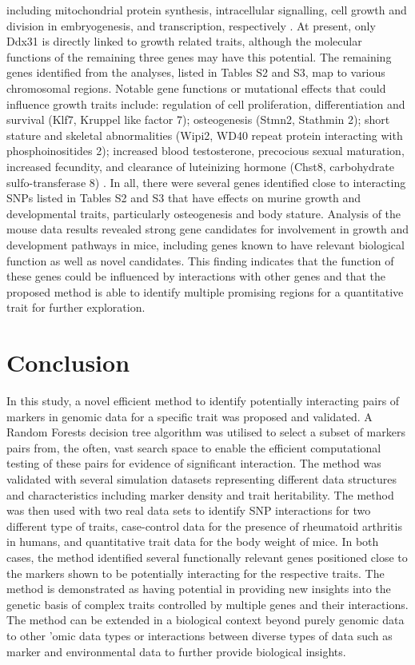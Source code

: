 \documentclass[preprint,12pt,3p]{elsarticle}
\begin{document}
including mitochondrial protein synthesis, intracellular signalling, cell growth and division in embryogenesis, and
transcription, respectively \cite[]{stelzerGeneCardsSuiteGene2016}. At present, only Ddx31 is directly linked to
growth related traits, although the molecular functions of the remaining three genes may have this potential.  The
remaining genes identified from the analyses, listed in Tables S2 and S3, map to various chromosomal regions. Notable
gene functions or mutational effects that could influence growth traits include: regulation of cell proliferation,
differentiation and survival (Klf7, Kruppel like factor 7); osteogenesis (Stmn2, Stathmin 2); short stature and skeletal
abnormalities (Wipi2, WD40 repeat protein interacting with phosphoinositides 2); increased blood testosterone,
precocious sexual maturation, increased fecundity, and clearance of luteinizing hormone (Chst8, carbohydrate
sulfo-transferase 8) \cite[]{stelzerGeneCardsSuiteGene2016}. In all, there were several genes identified close to
interacting SNPs listed in Tables S2 and S3 that have effects on murine growth and developmental traits, particularly
osteogenesis and body stature.  Analysis of the mouse data results revealed strong gene candidates for involvement in
growth and development pathways in mice, including genes known to have relevant biological function as well as novel
candidates. This finding indicates that the function of these genes could be influenced by interactions with other genes
and that the proposed method is able to identify multiple promising regions for a quantitative trait for further
exploration.



\section{Conclusion}

In this study, a novel efficient method to identify potentially interacting pairs of markers in genomic data for a
specific trait was proposed and validated. A Random Forests decision tree algorithm was utilised to select a subset of
markers pairs from, the often, vast search space to enable the efficient computational testing of these pairs for
evidence of significant interaction. The method was validated with several simulation datasets representing different
data structures and characteristics including marker density and trait heritability. The method was then used with two
real data sets to identify SNP interactions for two different type of traits, case-control data for the presence of
rheumatoid arthritis in humans, and quantitative trait data for the body weight of mice. In both cases, the method
identified several functionally relevant genes positioned close to the markers shown to be potentially interacting for
the respective traits. The method is demonstrated as having potential in providing new insights into the genetic basis
of complex traits controlled by multiple genes and their interactions. The method can be extended in a biological
context beyond purely genomic data to other 'omic data types or interactions between diverse types of data such as
marker and environmental data to further provide biological insights.
\end{document}
